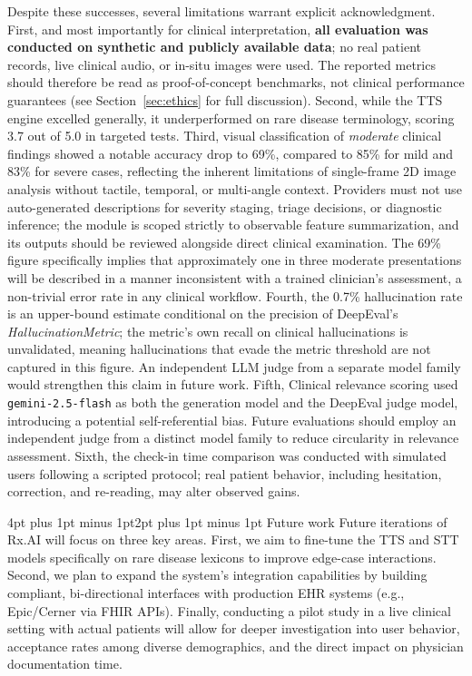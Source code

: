 \documentclass[sigplan,screen]{acmart}
\makeatletter
\renewcommand{\subsection}{\@startsection{subsection}{2}{\z@}
  {4pt plus 1pt minus 1pt}{2pt plus 1pt minus 1pt}
  {\normalfont\normalsize\bfseries}}
\makeatother
\begin{document}
Despite these successes, several limitations warrant explicit acknowledgment.
First, and most importantly for clinical interpretation, \textbf{all evaluation
was conducted on synthetic and publicly available data}; no real patient records,
live clinical audio, or in-situ images were used. The reported metrics should
therefore be read as proof-of-concept benchmarks, not clinical performance
guarantees (see Section~\ref{sec:ethics} for full discussion). Second, while
the TTS engine excelled generally, it underperformed on rare disease terminology,
scoring 3.7 out of 5.0 in targeted tests. Third, visual classification of \textit{moderate} clinical findings showed
a notable accuracy drop to 69\%, compared to 85\% for mild and 83\% for
severe cases, reflecting the inherent limitations of single-frame 2D image
analysis without tactile, temporal, or multi-angle context. Providers must
not use auto-generated descriptions for severity staging, triage decisions,
or diagnostic inference; the module is scoped strictly to observable feature
summarization, and its outputs should be reviewed alongside direct clinical
examination. The 69\% figure specifically implies that approximately one in
three moderate presentations will be described in a manner inconsistent with
a trained clinician's assessment, a non-trivial error rate in any clinical
workflow. Fourth, the 0.7\% hallucination rate is an upper-bound estimate conditional
on the precision of DeepEval's \textit{HallucinationMetric}; the metric's
own recall on clinical hallucinations is unvalidated, meaning hallucinations
that evade the metric threshold are not captured in this figure. An
independent LLM judge from a separate model family would strengthen this
claim in future work. Fifth, Clinical relevance scoring used \texttt{gemini-2.5-flash} as both the
generation model and the DeepEval judge model, introducing a potential
self-referential bias. Future evaluations should employ an independent
judge from a distinct model family to reduce circularity in relevance
assessment. Sixth, the check-in time comparison was conducted with simulated users
following a scripted protocol; real patient behavior, including hesitation,
correction, and re-reading, may alter observed gains. 

\subsection{Future work}
\label{sec:future}
Future iterations of Rx.AI will focus on three key areas. First, we aim to fine-tune the TTS and STT models specifically on rare disease lexicons to improve edge-case interactions. Second, we plan to expand the system's integration capabilities by building compliant, bi-directional interfaces with production EHR systems (e.g., Epic/Cerner via FHIR APIs). Finally, conducting a pilot study in a live clinical setting with actual patients will allow for deeper investigation into user behavior, acceptance rates among diverse demographics, and the direct impact on physician documentation time.
\end{document}
